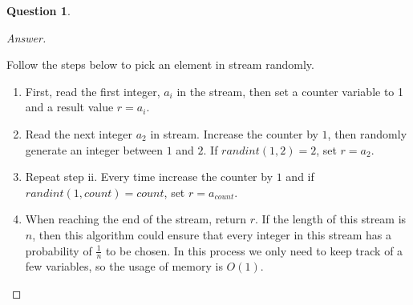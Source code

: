 \documentclass{article}
\theoremstyle{plain}
\newtheorem{question}{Question}
\newenvironment{answer}[1][Answer]
    {\begin{proof}[#1]{$ $}\renewcommand\qedsymbol{$\vartriangle$}}
    {\end{proof}}
\begin{document}
\begin{question}
\end{question}
\begin{answer}
    \begin{enumerate}
    Follow the steps below to pick an element in stream randomly.
        \begin{enumerate}
            \item First, read the first integer, $a_i$ in the stream, then set a counter variable to 1 and a result value $r = a_i$.
            \item Read the next integer $a_2$ in stream. Increase the counter by $1$, then randomly generate an integer between $1$ and $2$. If $randint(1, 2) = 2$, set $r = a_2$.
            \item Repeat step ii. Every time increase the counter by $1$ and if $randint(1, count) = count$, set $r = a_{count}$.
            \item When reaching the end of the stream, return $r$. If the length of this stream is $n$, then this algorithm could ensure that every integer in this stream has a probability of $\frac{1}{n}$ to be chosen. In this process we only need to keep track of a few variables, so the usage of memory is $O(1)$.
        \end{enumerate}
    \end{enumerate}

\end{answer}
\end{document}
